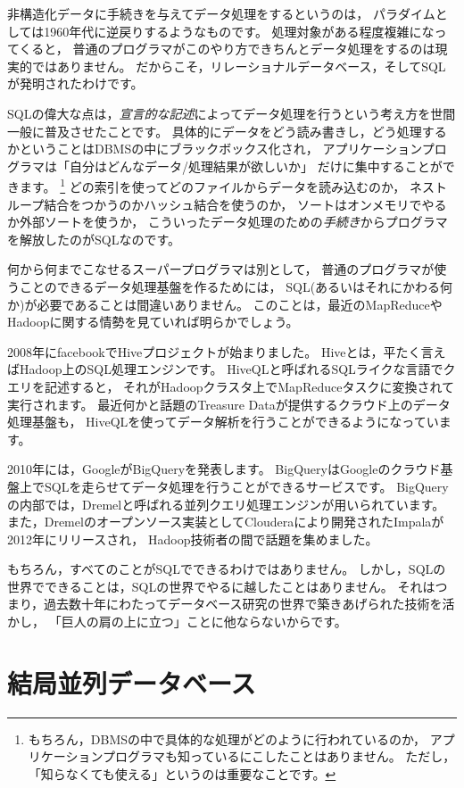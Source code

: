 非構造化データに手続きを与えてデータ処理をするというのは，
パラダイムとしては1960年代に逆戻りするようなものです。
処理対象がある程度複雑になってくると，
普通のプログラマがこのやり方できちんとデータ処理をするのは現実的ではありません。
だからこそ，リレーショナルデータベース，そしてSQLが発明されたわけです。

SQLの偉大な点は，{\em 宣言的な記述}によってデータ処理を行うという考え方を世間一般に普及させたことです。
具体的にデータをどう読み書きし，どう処理するかということはDBMSの中にブラックボックス化され，
アプリケーションプログラマは「自分はどんなデータ/処理結果が欲しいか」
だけに集中することができます。
\footnote{もちろん，DBMSの中で具体的な処理がどのように行われているのか，
アプリケーションプログラマも知っているにこしたことはありません。
ただし，「知らなくても使える」というのは重要なことです。}
どの索引を使ってどのファイルからデータを読み込むのか，
ネストループ結合をつかうのかハッシュ結合を使うのか，
ソートはオンメモリでやるか外部ソートを使うか，
こういったデータ処理のための{\em 手続き}からプログラマを解放したのがSQLなのです。

何から何までこなせるスーパープログラマは別として，
普通のプログラマが使うことのできるデータ処理基盤を作るためには，
SQL(あるいはそれにかわる何か)が必要であることは間違いありません。
このことは，最近のMapReduceやHadoopに関する情勢を見ていれば明らかでしょう。

2008年にfacebookでHiveプロジェクトが始まりました。
Hiveとは，平たく言えばHadoop上のSQL処理エンジンです。
HiveQLと呼ばれるSQLライクな言語でクエリを記述すると，
それがHadoopクラスタ上でMapReduceタスクに変換されて実行されます。
最近何かと話題のTreasure Dataが提供するクラウド上のデータ処理基盤も，
HiveQLを使ってデータ解析を行うことができるようになっています。

2010年には，GoogleがBigQueryを発表します。
BigQueryはGoogleのクラウド基盤上でSQLを走らせてデータ処理を行うことができるサービスです。
BigQueryの内部では，Dremelと呼ばれる並列クエリ処理エンジンが用いられています。
また，Dremelのオープンソース実装としてClouderaにより開発されたImpalaが2012年にリリースされ，
Hadoop技術者の間で話題を集めました。

もちろん，すべてのことがSQLでできるわけではありません。
しかし，SQLの世界でできることは，SQLの世界でやるに越したことはありません。
それはつまり，過去数十年にわたってデータベース研究の世界で築きあげられた技術を活かし，
「巨人の肩の上に立つ」ことに他ならないからです。

\section{結局並列データベース}

